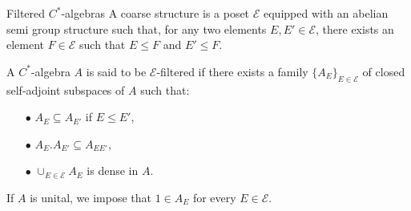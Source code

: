 
\begin{frame}{Filtered $C^*$-algebras}	
A coarse structure is a poset $\mathcal E$ equipped with an abelian semi group structure such that, for any two elements $E,E'\in \mathcal E$, there exists an element $F\in \mathcal E$ such that $E\leq F$ and $E'\leq F$. \\

\begin{definition}
A $C^*$-algebra $A$ is said to be $\mathcal E$-filtered if there exists a family $\{A_E \}_{E\in \mathcal E}$ of closed self-adjoint subspaces of $A$ such that:
\begin{itemize}
\item[$\bullet$] $A_E \subseteq A_{E'}$ if $E\leq E'$,
\item[$\bullet$] $A_E . A_{E'} \subseteq A_{EE'}$,
\item[$\bullet$] $\cup_{E\in \mathcal E} A_E$ is dense in $A$.
\end{itemize} 
If $A$ is unital, we impose that $1\in A_E$ for every $E\in \mathcal E$.
\end{definition}
\end{frame}
